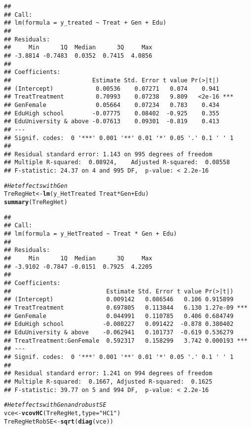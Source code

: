 \documentclass[11pt, a4paper]{article}\usepackage[]{graphicx}\usepackage[]{color}
\makeatletter
\newcommand{\hlstr}[1]{\textcolor[rgb]{0.192,0.494,0.8}{#1}}%
\newcommand{\hlcom}[1]{\textcolor[rgb]{0.678,0.584,0.686}{\textit{#1}}}%
\newcommand{\hlopt}[1]{\textcolor[rgb]{0,0,0}{#1}}%
\newcommand{\hlstd}[1]{\textcolor[rgb]{0.345,0.345,0.345}{#1}}%
\newcommand{\hlkwb}[1]{\textcolor[rgb]{0.69,0.353,0.396}{#1}}%
\newcommand{\hlkwc}[1]{\textcolor[rgb]{0.333,0.667,0.333}{#1}}%
\newcommand{\hlkwd}[1]{\textcolor[rgb]{0.737,0.353,0.396}{\textbf{#1}}}%
\newenvironment{kframe}{%
 \def\at@end@of@kframe{}%
 \ifinner\ifhmode%
  \def\at@end@of@kframe{\end{minipage}}%
  \begin{minipage}{\columnwidth}%
 \fi\fi%
 \def\FrameCommand##1{\hskip\@totalleftmargin \hskip-\fboxsep
 \colorbox{shadecolor}{##1}\hskip-\fboxsep
     \hskip-\linewidth \hskip-\@totalleftmargin \hskip\columnwidth}%
 \MakeFramed {\advance\hsize-\width
   \@totalleftmargin\z@ \linewidth\hsize
   \@setminipage}}%
 {\par\unskip\endMakeFramed%
 \at@end@of@kframe}
\newenvironment{knitrout}{}{} %
\makeatother
\begin{document}
\begin{knitrout}
\begin{kframe}
\begin{alltt}
\end{alltt}
\begin{verbatim}
## 
## Call:
## lm(formula = y_treated ~ Treat + Gen + Edu)
## 
## Residuals:
##     Min      1Q  Median      3Q     Max 
## -3.8814 -0.7483  0.0352  0.7415  4.0856 
## 
## Coefficients:
##                       Estimate Std. Error t value Pr(>|t|)    
## (Intercept)            0.00536    0.07271   0.074    0.941    
## TreatTreatment         0.70993    0.07238   9.809   <2e-16 ***
## GenFemale              0.05664    0.07234   0.783    0.434    
## EduHigh school        -0.07775    0.08402  -0.925    0.355    
## EduUniversity & above -0.07613    0.09301  -0.819    0.413    
## ---
## Signif. codes:  0 '***' 0.001 '**' 0.01 '*' 0.05 '.' 0.1 ' ' 1
## 
## Residual standard error: 1.143 on 995 degrees of freedom
## Multiple R-squared:  0.08924,	Adjusted R-squared:  0.08558 
## F-statistic: 24.37 on 4 and 995 DF,  p-value: < 2.2e-16
\end{verbatim}
\begin{alltt}
  \hlcom{#Het effects with Gen}
  \hlstd{TreRegHet} \hlkwb{<-} \hlkwd{lm}\hlstd{(y_HetTreated} \hlopt{~} \hlstd{Treat}\hlopt{*}\hlstd{Gen} \hlopt{+} \hlstd{Edu)}
  \hlkwd{summary}\hlstd{(TreRegHet)}
\end{alltt}
\begin{verbatim}
## 
## Call:
## lm(formula = y_HetTreated ~ Treat * Gen + Edu)
## 
## Residuals:
##     Min      1Q  Median      3Q     Max 
## -3.9102 -0.7847 -0.0151  0.7925  4.2205 
## 
## Coefficients:
##                           Estimate Std. Error t value Pr(>|t|)    
## (Intercept)               0.009142   0.086546   0.106 0.915899    
## TreatTreatment            0.697805   0.113844   6.130 1.27e-09 ***
## GenFemale                 0.044991   0.110785   0.406 0.684749    
## EduHigh school           -0.080227   0.091422  -0.878 0.380402    
## EduUniversity & above    -0.062941   0.101737  -0.619 0.536279    
## TreatTreatment:GenFemale  0.592317   0.158299   3.742 0.000193 ***
## ---
## Signif. codes:  0 '***' 0.001 '**' 0.01 '*' 0.05 '.' 0.1 ' ' 1
## 
## Residual standard error: 1.241 on 994 degrees of freedom
## Multiple R-squared:  0.1667,	Adjusted R-squared:  0.1625 
## F-statistic: 39.77 on 5 and 994 DF,  p-value: < 2.2e-16
\end{verbatim}
\begin{alltt}
  \hlcom{#Het effects with Gen and robust SE}
  \hlstd{vce} \hlkwb{<-} \hlkwd{vcovHC}\hlstd{(TreRegHet,} \hlkwc{type} \hlstd{=} \hlstr{"HC1"}\hlstd{)}
  \hlstd{TreRegHetRobSE} \hlkwb{<-} \hlkwd{sqrt}\hlstd{(}\hlkwd{diag}\hlstd{(vce))}

\end{alltt}
\end{kframe}
\end{knitrout}
\end{document}

